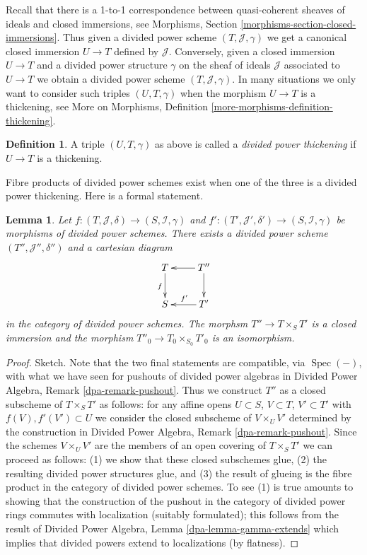\documentclass{stacks-project}
\theoremstyle{plain}
\newtheorem{lemma}[subsection]{Lemma}
\theoremstyle{definition}
\newtheorem{definition}[subsection]{Definition}
\theoremstyle{remark}
\numberwithin{equation}{subsection}
\def\Spec{\mathop{\mathrm{Spec}}}
\begin{document}
\noindent
Recall that there is a 1-to-1 correspondence between quasi-coherent
sheaves of ideals and closed immersions, see
Morphisms, Section \ref{morphisms-section-closed-immersions}.
Thus given a divided power scheme $(T, \mathcal{J}, \gamma)$ we
get a canonical closed immersion $U \to T$ defined by $\mathcal{J}$.
Conversely, given a closed immersion $U \to T$ and a divided power
structure $\gamma$ on the sheaf of ideals $\mathcal{J}$ associated
to $U \to T$ we obtain a divided power scheme $(T, \mathcal{J}, \gamma)$.
In many situations we only want to consider such triples
$(U, T, \gamma)$ when the morphism $U \to T$ is a thickening, see
More on Morphisms, Definition \ref{more-morphisms-definition-thickening}.

\begin{definition}
\label{definition-divided-power-thickening}
A triple $(U, T, \gamma)$ as above is called a {\it divided power thickening}
if $U \to T$ is a thickening.
\end{definition}

\noindent
Fibre products of divided power schemes exist when one of the
three is a divided power thickening. Here is a formal statement.

\begin{lemma}
\label{lemma-fibre-product}
Let $f : (T, \mathcal{J}, \delta) \to (S, \mathcal{I}, \gamma)$ and
$f' : (T', \mathcal{J}', \delta') \to (S, \mathcal{I}, \gamma)$
be morphisms of divided power schemes. There exists a divided power scheme
$(T'', \mathcal{J}'', \delta'')$ and a cartesian diagram
$$
\xymatrix{
T \ar[d]_f & T'' \ar[d] \ar[l] \\
S & T' \ar[l]_{f'}
}
$$
in the category of divided power schemes. The morphsm
$T'' \to T \times_S T'$ is a closed immersion and the morphism
$T''_0 \to T_0 \times_{S_0} T'_0$ is an isomorphism.
\end{lemma}

\begin{proof}
Sketch. Note that the two final statements are compatible, via $\Spec(-)$,
with what we have seen for pushouts of divided power algebras in
Divided Power Algebra, Remark \ref{dpa-remark-pushout}.
Thus we construct $T''$ as a closed subscheme of $T \times_S T'$
as follows: for any affine opens $U \subset S$, $V \subset T$,
$V' \subset T'$ with $f(V), f'(V') \subset U$ we consider the closed
subscheme of $V \times_U V'$ determined by the construction in
Divided Power Algebra, Remark \ref{dpa-remark-pushout}. Since the
schemes $V \times_U V'$ are the members of an open covering
of $T \times_S T'$ we can proceed as follows: (1) we show that these
closed subschemes glue, (2) the resulting
divided power structures glue, and (3) the result of glueing
is the fibre product in the category of divided power schemes.
To see (1) is true amounts to showing
that the construction of the pushout in the category of
divided power rings commutes with localization (suitably
formulated); this follows from the result of
Divided Power Algebra, Lemma \ref{dpa-lemma-gamma-extends} which implies
that divided powers extend to localizations (by flatness).
\end{proof}
\end{document}

